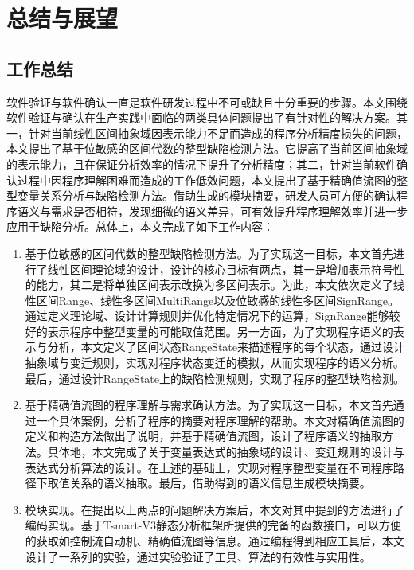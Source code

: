 
\chapter{总结与展望}

\section{工作总结}

软件验证与软件确认一直是软件研发过程中不可或缺且十分重要的步骤。本文围绕软件验证与确认在生产实践中面临的两类具体问题提出了有针对性的解决方案。其一，针对当前线性区间抽象域因表示能力不足而造成的程序分析精度损失的问题，本文提出了基于位敏感的区间代数的整型缺陷检测方法。它提高了当前区间抽象域的表示能力，且在保证分析效率的情况下提升了分析精度；其二，针对当前软件确认过程中因程序理解困难而造成的工作低效问题，本文提出了基于精确值流图的整型变量关系分析与缺陷检测方法。借助生成的模块摘要，研发人员可方便的确认程序语义与需求是否相符，发现细微的语义差异，可有效提升程序理解效率并进一步应用于缺陷分析。总体上，本文完成了如下工作内容：

\begin{enumerate}
	\item 基于位敏感的区间代数的整型缺陷检测方法。为了实现这一目标，本文首先进行了线性区间理论域的设计，设计的核心目标有两点，其一是增加表示符号性的能力，其二是将单独区间表示改换为多区间表示。为此，本文依次定义了线性区间Range、线性多区间MultiRange以及位敏感的线性多区间SignRange。通过定义理论域、设计计算规则并优化特定情况下的运算，SignRange能够较好的表示程序中整型变量的可能取值范围。另一方面，为了实现程序语义的表示与分析，本文定义了区间状态RangeState来描述程序的每个状态，通过设计抽象域与变迁规则，实现对程序状态变迁的模拟，从而实现程序的语义分析。最后，通过设计RangeState上的缺陷检测规则，实现了程序的整型缺陷检测。
	
	\item 基于精确值流图的程序理解与需求确认方法。为了实现这一目标，本文首先通过一个具体案例，分析了程序的摘要对程序理解的帮助。本文对精确值流图的定义和构造方法做出了说明，并基于精确值流图，设计了程序语义的抽取方法。具体地，本文完成了关于变量表达式的抽象域的设计、变迁规则的设计与表达式分析算法的设计。在上述的基础上，实现对程序整型变量在不同程序路径下取值关系的语义抽取。最后，借助得到的语义信息生成模块摘要。
	
	\item 模块实现。在提出以上两点的问题解决方案后，本文对其中提到的方法进行了编码实现。基于Tsmart-V3静态分析框架所提供的完备的函数接口，可以方便的获取如控制流自动机、精确值流图等信息。通过编程得到相应工具后，本文设计了一系列的实验，通过实验验证了工具、算法的有效性与实用性。
\end{enumerate}

